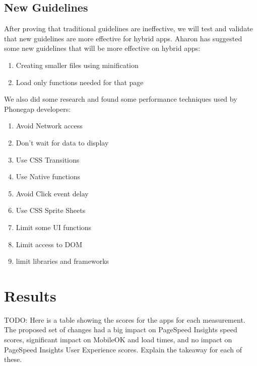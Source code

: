 \documentclass{acm_proc_article-sp}
\begin{document}
\subsection{New Guidelines}
After proving that traditional guidelines are ineffective, we will test and validate that new guidelines are more effective for hybrid apps.
Aharon has suggested some new guidelines that will be more effective on hybrid apps:
\vspace{-1.0em}
\begin{enumerate}\itemsep1pt \parskip0pt 
	\item Creating smaller files using minification
	\item Load only functions needed for that page
\end{enumerate}
We also did some research and found some performance techniques used by Phonegap developers:
\vspace{-1.0em}
\begin{enumerate}\itemsep1pt \parskip0pt 
	\item Avoid Network access
	\item Don't wait for data to display
	\item Use CSS Transitions
	\item Use Native functions
	\item Avoid Click event delay
	\item Use CSS Sprite Sheets
	\item Limit some UI functions
	\item Limit access to DOM
	\item limit libraries and frameworks
\end{enumerate}
\section{Results}
TODO: Here is a table showing the scores for the apps for each measurement. The proposed set of changes had a big impact on PageSpeed Insights speed scores, significant impact on MobileOK and load times, and no impact on PageSpeed Insights User Experience scores. Explain the takeaway for each of these. 
\end{document}
